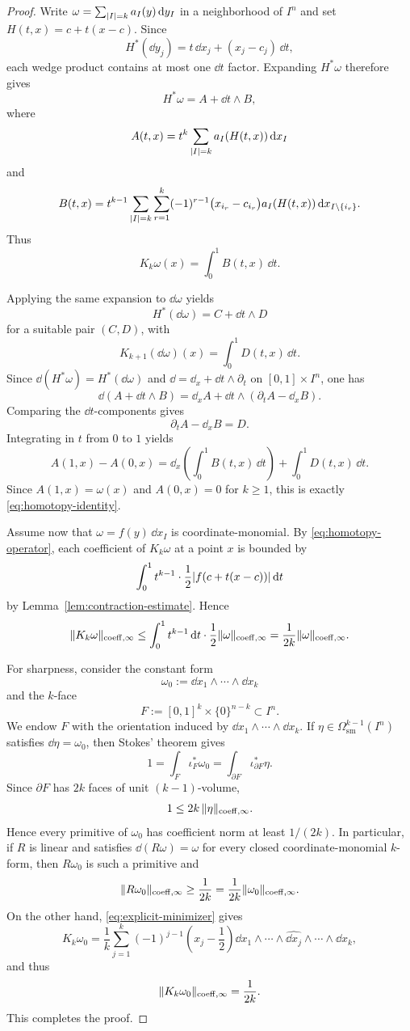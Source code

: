 \begin{proof}
Write $\omega=\sum_{\lvert I \rvert=k}a_I(y)\,\mathrm{d} y_I$ in a neighborhood of $I^n$ and
set $H(t,x)=c+t(x-c)$. Since
\[
H^\ast(\dd y_j)=t\,\dd x_j+(x_j-c_j)\,\dd t,
\]
each wedge product contains at most one $\dd t$ factor. Expanding $H^\ast\omega$
therefore gives
\[
H^\ast\omega=A+\dd t\wedge B,
\]
where
\[
A(t,x)=t^k\sum_{\lvert I \rvert=k} a_I(H(t,x))\,\mathrm{d} x_I
\]
and
\[
B(t,x)=
t^{k-1}\sum_{\lvert I \rvert=k}\sum_{r=1}^k (-1)^{r-1}
\bigl(x_{i_r}-c_{i_r}\bigr)a_I(H(t,x))\,
\mathrm{d} x_{I\setminus\{i_r\}}.
\]
Thus
\[
K_k\omega(x)=\int_0^1 B(t,x)\,\dd t.
\]

Applying the same expansion to $\dd\omega$ yields
\[
H^\ast(\dd\omega)=C+\dd t\wedge D
\]
for a suitable pair $(C,D)$, with
\[
K_{k+1}(\dd\omega)(x)=\int_0^1 D(t,x)\,\dd t.
\]
Since $\dd(H^\ast\omega)=H^\ast(\dd\omega)$ and
$\dd=\dd_x+\dd t\wedge\partial_t$ on $[0,1]\times I^n$, one has
\[
\dd(A+\dd t\wedge B)=\dd_xA+\dd t\wedge(\partial_tA-\dd_xB).
\]
Comparing the $\dd t$-components gives
\[
\partial_tA-\dd_xB=D.
\]
Integrating in $t$ from $0$ to $1$ yields
\[
A(1,x)-A(0,x)=
\dd_x\!\left(\int_0^1 B(t,x)\,\dd t\right)+\int_0^1 D(t,x)\,\dd t.
\]
Since $A(1,x)=\omega(x)$ and $A(0,x)=0$ for $k\ge 1$, this is exactly
\eqref{eq:homotopy-identity}.

Assume now that $\omega=f(y)\,\dd x_I$ is coordinate-monomial. By
\eqref{eq:homotopy-operator}, each coefficient of $K_k\omega$ at a point $x$ is
bounded by
\[
\int_0^1 t^{k-1}\cdot
\frac12\lvert f(c+t(x-c)) \rvert\,\mathrm{d} t
\]
by Lemma~\ref{lem:contraction-estimate}. Hence
\[
\lVert K_k\omega \rVert_{\mathrm{coeff},\infty}
\le
\int_0^1 t^{k-1}\,\mathrm{d} t\cdot \frac12\lVert \omega \rVert_{\mathrm{coeff},\infty}
=
\frac{1}{2k}\lVert \omega \rVert_{\mathrm{coeff},\infty}.
\]

For sharpness, consider the constant form
\[
\omega_0:=\dd x_1\wedge\cdots\wedge \dd x_k
\]
and the $k$-face
\[
F:=[0,1]^k\times\{0\}^{n-k}\subset I^n.
\]
We endow $F$ with the orientation induced by
$\dd x_1\wedge\cdots\wedge \dd x_k$. If
$\eta\in\Omega^{k-1}_{\mathrm{sm}}(I^n)$ satisfies $\dd\eta=\omega_0$, then
Stokes' theorem gives
\[
1
=
\int_F \iota_F^\ast\omega_0
=
\int_{\partial F}\iota_{\partial F}^\ast\eta.
\]
Since $\partial F$ has $2k$ faces of unit $(k-1)$-volume,
\[
1
\le
2k\,\lVert \eta \rVert_{\mathrm{coeff},\infty}.
\]
Hence every primitive of $\omega_0$ has coefficient norm at least $1/(2k)$.
In particular, if $R$ is linear and satisfies $\dd(R\omega)=\omega$ for every
closed coordinate-monomial $k$-form, then $R\omega_0$ is such a primitive and
\[
\lVert R\omega_0 \rVert_{\mathrm{coeff},\infty}\ge \frac{1}{2k}
=
\frac{1}{2k}\lVert \omega_0 \rVert_{\mathrm{coeff},\infty}.
\]
On the other hand, \eqref{eq:explicit-minimizer} gives
\[
K_k\omega_0=
\frac{1}{k}\sum_{j=1}^k (-1)^{j-1}\left(x_j-\frac12\right)
\dd x_1\wedge\cdots\wedge\widehat{\dd x_j}\wedge\cdots\wedge \dd x_k,
\]
and thus
\[
\lVert K_k\omega_0 \rVert_{\mathrm{coeff},\infty}=\frac{1}{2k}.
\]
This completes the proof.
\end{proof}


